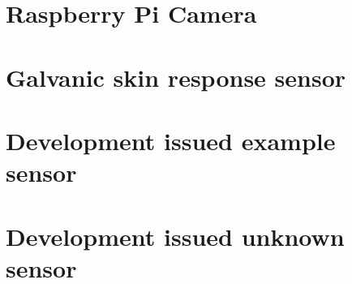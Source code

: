 \documentclass{report}
\begin{document}
\chapter{Raspberry Pi Camera}

\chapter{Galvanic skin response sensor}

\chapter{Development issued example sensor}

\chapter{Development issued unknown sensor}
\end{document}
